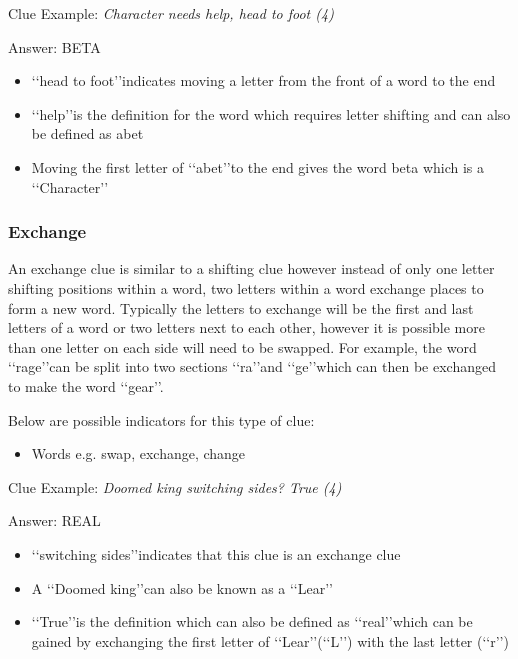 Clue Example: \emph{Character needs help, head to foot (4)} 

Answer: BETA 

\begin{itemize}
	\item \lq\lq head to foot\rq\rq indicates moving a letter from the front of a word to the end 
	\item \lq\lq help\rq\rq is the definition for the word which requires letter shifting and can also be defined as abet 
	\item Moving the first letter of \lq\lq abet\rq\rq to the end gives the word beta which is a \lq\lq Character\rq\rq
\end{itemize}

\subsubsection{Exchange}

An exchange clue is similar to a shifting clue however instead of only one letter shifting positions within a word, two letters within a word exchange places to form a new word. Typically the letters to exchange will be the first and last letters of a word or two letters next to each other, however it is possible more than one letter on each side will need to be swapped. For example, the word \lq\lq rage\rq\rq can be split into two sections \lq\lq ra\rq\rq and \lq\lq ge\rq\rq which can then be exchanged to make the word \lq\lq gear\rq\rq.   

Below are possible indicators for this type of clue:
\begin{itemize} 
	\item Words e.g. swap, exchange, change 
\\
\end{itemize}



Clue Example: \emph{Doomed king switching sides? True (4)} 

Answer: REAL 

\begin{itemize}
	\item \lq\lq switching sides\rq\rq indicates that this clue is an exchange clue 
	\item A \lq\lq Doomed king\rq\rq can also be known as a \lq\lq Lear\rq\rq
	\item \lq\lq True\rq\rq is the definition which can also be defined as \lq\lq real\rq\rq which can be gained by exchanging the first letter of \lq\lq Lear\rq\rq (\lq\lq L\rq\rq) with the last letter (\lq\lq r\rq\rq) 
\end{itemize}
